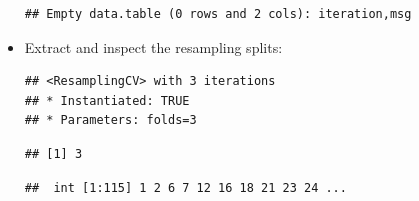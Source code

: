 \documentclass[
]{scrbook}
\newenvironment{Shaded}{\begin{snugshade}}{\end{snugshade}}
\newcommand{\DecValTok}[1]{\textcolor[rgb]{0.00,0.00,0.81}{#1}}
\newcommand{\FunctionTok}[1]{\textcolor[rgb]{0.00,0.00,0.00}{#1}}
\newcommand{\NormalTok}[1]{#1}
\newcommand{\SpecialCharTok}[1]{\textcolor[rgb]{0.00,0.00,0.00}{#1}}
\renewenvironment{Shaded} {\begin{snugshade}\small} {\end{snugshade}}
\begin{document}
\begin{itemize}
\begin{Shaded}
\end{Shaded}

\begin{verbatim}
## Empty data.table (0 rows and 2 cols): iteration,msg
\end{verbatim}
\item
  Extract and inspect the resampling splits:

\begin{Shaded}
\end{Shaded}

\begin{verbatim}
## <ResamplingCV> with 3 iterations
## * Instantiated: TRUE
## * Parameters: folds=3
\end{verbatim}

\begin{Shaded}
\end{Shaded}

\begin{verbatim}
## [1] 3
\end{verbatim}

\begin{Shaded}
\end{Shaded}

\begin{verbatim}
##  int [1:115] 1 2 6 7 12 16 18 21 23 24 ...
\end{verbatim}

\begin{Shaded}
\end{Shaded}


\end{itemize}
\end{document}
